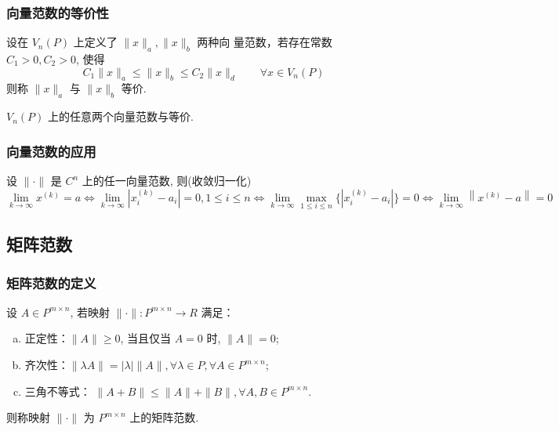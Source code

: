 \subsubsection{向量范数的等价性}
\begin{definition}
设在 \( V_{n}(P) \) 上定义了 \( \|x\|_{a},\|x\|_{b} \) 两种向 量范数，若存在常数 \( C_{1}>0, C_{2}>0 \), 使得
\[
C_{1}\|x\|_{a} \leq\|x\|_{b} \leq C_{2}\|x\|_{d}\qquad \forall x \in V_{n}(P)
\]
则称 \( \|x\|_{a} \) 与 \( \|x\|_{b} \) 等价.
\end{definition}

\begin{theorem}
	\( V_{n}(P) \) 上的任意两个向量范数与等价.
\end{theorem}

\subsubsection{向量范数的应用}
\begin{theorem}
设 \( \|\cdot\| \) 是 \( C^{n} \) 上的任一向量范数, 则(收敛归一化)
\[
\lim _{k \rightarrow \infty} x^{(k)}=a 
\Leftrightarrow\lim _{k \rightarrow \infty}|x_i^{(k)}-a_i|=0, 1\leq i\leq n
\Leftrightarrow\lim _{k \rightarrow \infty}\max\limits_{1\leq i\leq n}\{ |x_i^{(k)}-a_i|\}=0
\Leftrightarrow \lim _{k \rightarrow \infty}\left\|x^{(k)}-a\right\|=0
\]
\end{theorem}

\subsection{矩阵范数}
\subsubsection{矩阵范数的定义}
\begin{definition}
	设 \( A \in P^{m \times n} \), 若映射 \( \|\cdot\|: P^{m \times n} \rightarrow R \) 满足：
	\begin{enumerate}[(a)]
		\item 正定性：\( \|A\| \geq 0 \), 当且仅当 \( A=0 \) 时, \( \|A\|=0 \);
		\item 齐次性：\( \|\lambda A\|=|\lambda|\|A\|, \forall \lambda \in P, \forall A \in P^{m \times n} \);
		\item 三角不等式： \( \|A+B\| \leq\|A\|+\|B\|, \forall A, B \in P^{m \times n} \).
	\end{enumerate}
		则称映射 \( \|\cdot\| \) 为 \( P^{m \times n} \) 上的矩阵范数.
\end{definition}

